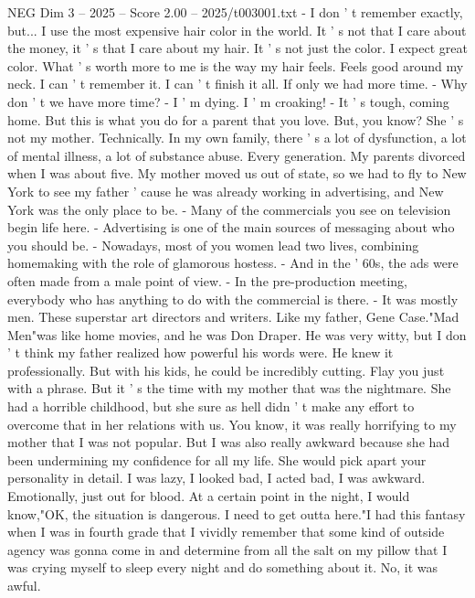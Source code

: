 \begin{textsample}{NEG Dim 3 – 2025 – Score 2.00 – 2025/t003001.txt}  \label{ex:f3_neg_056}
- I don ' t remember exactly, but...
I use the most expensive hair color in the world.
It ' s not that I care about the money, it ' s that I care about my hair.
It ' s not just the color.
I expect great color.
What ' s worth more to me is the way my hair feels.
Feels good around my neck.
I can ' t remember it.
I can ' t finish it all.
If only we had more time. - Why don ' t we have more time? - I ' m dying.
I ' m croaking! - It ' s tough, coming home.
But this is what you do for a parent that you love.
But, you know?
She ' s not my mother.
Technically.
In my own family, there ' s a lot of dysfunction, a lot of mental illness, a lot of substance abuse.
Every generation.
My parents divorced when I was about five.
My mother moved us out of state, so we had to fly to New York to see my father ' cause he was already working in advertising, and New York was the only place to be. - Many of the commercials you see on television begin life here. - Advertising is one of the main sources of messaging about who you should be. - Nowadays, most of you women lead two lives, combining homemaking with the role of glamorous hostess. - And in the ' 60s, the ads were often made from a male point of view. - In the pre-production meeting, everybody who has anything to do with the commercial is there. - It was mostly men.
These superstar art directors and writers.
Like my father, Gene Case."Mad Men"was like home movies, and he was Don Draper.
He was very witty, but I don ' t think my father realized how powerful his words were.
He knew it professionally.
But with his kids, he could be incredibly cutting.
Flay you just with a phrase.
But it ' s the time with my mother that was the nightmare.
She had a horrible childhood, but she sure as hell didn ' t make any effort to overcome that in her relations with us.
You know, it was really horrifying to my mother that I was not popular.
But I was also really awkward because she had been undermining my confidence for all my life.
She would pick apart your personality in detail.
I was lazy, I looked bad, I acted bad, I was awkward.
Emotionally, just out for blood.
At a certain point in the night, I would know,"OK, the situation is dangerous.
I need to get outta here."I had this fantasy when I was in fourth grade that I vividly remember that some kind of outside agency was gonna come in and determine from all the salt on my pillow that I was crying myself to sleep every night and do something about it.
No, it was awful.

\end{textsample}
